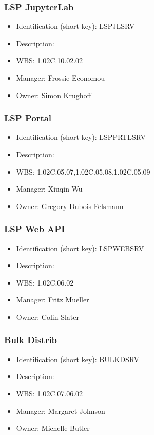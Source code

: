\subsubsection{LSP JupyterLab}\label{sect:LSPJLSRV}
\begin{itemize}
\item Identification (short key): LSPJLSRV
\item Description: 
\item WBS: 1.02C.10.02.02
\item Manager: Frossie Economou
\item Owner: Simon Krughoff
\end{itemize}

\subsubsection{LSP Portal}\label{sect:LSPPRTLSRV}
\begin{itemize}
\item Identification (short key): LSPPRTLSRV
\item Description: 
\item WBS: 1.02C.05.07,1.02C.05.08,1.02C.05.09
\item Manager: Xiuqin Wu
\item Owner: Gregory Dubois-Felsmann
\end{itemize}

\subsubsection{LSP Web API}\label{sect:LSPWEBSRV}
\begin{itemize}
\item Identification (short key): LSPWEBSRV
\item Description: 
\item WBS: 1.02C.06.02
\item Manager: Fritz Mueller
\item Owner: Colin Slater
\end{itemize}

\subsubsection{Bulk Distrib}\label{sect:BULKDSRV}
\begin{itemize}
\item Identification (short key): BULKDSRV
\item Description: 
\item WBS: 1.02C.07.06.02
\item Manager: Margaret Johnson
\item Owner: Michelle Butler
\end{itemize}

